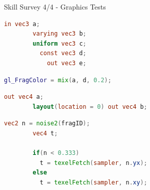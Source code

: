 \begin{frame}[fragile]{Skill Survey 4/4 - Graphics Tests}

	\pause
	\begin{lstlisting}[language=glsl]
		     in vec3 a;
		varying vec3 b;
		uniform vec3 c;
		  const vec3 d;
		    out vec3 e;
	\end{lstlisting}

	\pause
	\begin{lstlisting}[language=glsl]
		gl_FragColor = mix(a, d, 0.2);
	\end{lstlisting}

	\pause
	\begin{lstlisting}[language=glsl]
		                     out vec4 a;
		layout(location = 0) out vec4 b;
	\end{lstlisting}

	\pause
	\begin{lstlisting}[language=glsl]
		vec2 n = noise2(fragID);
		vec4 t;
		
		if(n < 0.333)
		  t = texelFetch(sampler, n.yx);
		else
		  t = texelFetch(sampler, n.xy);
	\end{lstlisting}

\end{frame}



\begin{frame}[plain]
\end{frame}


